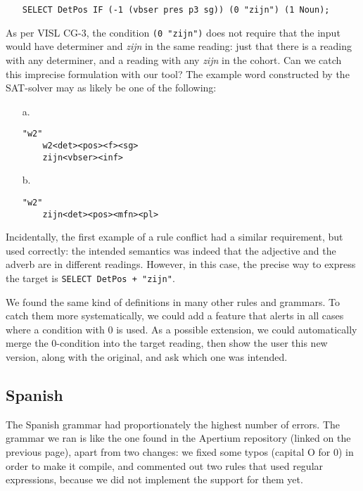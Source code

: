 \begin{itemize}
\item[] 
\texttt{SELECT DetPos IF (-1 (vbser pres p3 sg)) (0 "zijn") (1 Noun);}
\end{itemize} 

As per VISL CG-3, the condition \texttt{(0 "zijn")} does not require
that the input would have determiner and \emph{zijn} in the same reading:
just that there is a reading with any determiner, and a reading with any \emph{zijn} in the cohort. 
Can we catch this imprecise formulation with our tool? The example word constructed by the SAT-solver may as likely be one of the following:

\begin{itemize}
\item[a.] \begin{verbatim}
"w2"
    w2<det><pos><f><sg>
    zijn<vbser><inf>
\end{verbatim}

\item[b.] \begin{verbatim}
"w2"
    zijn<det><pos><mfn><pl>
\end{verbatim}
\end{itemize}

Incidentally, the first example of a rule conflict had a similar
requirement, but used correctly: the intended semantics was indeed
that the adjective and the adverb are in different readings. However,
in this case, the precise way to express the target is \texttt{SELECT DetPos + "zijn"}.

We found the same kind of definitions in many other rules and grammars.
To catch them more systematically, we could add a feature that alerts in all cases where a condition with 0 is used. As a possible extension, we could automatically merge the 0-condition into the target reading, then show the user this new version, along with the original, and ask which one was intended.


\subsection{Spanish} The Spanish grammar had proportionately the
highest number of errors. The grammar we ran is like the one
found in the Apertium repository (linked on the previous page), 
apart from two changes: we fixed some typos (capital O for 0) in order to make it compile, and
commented out two rules that used regular expressions, because we did not implement the support for them yet.


